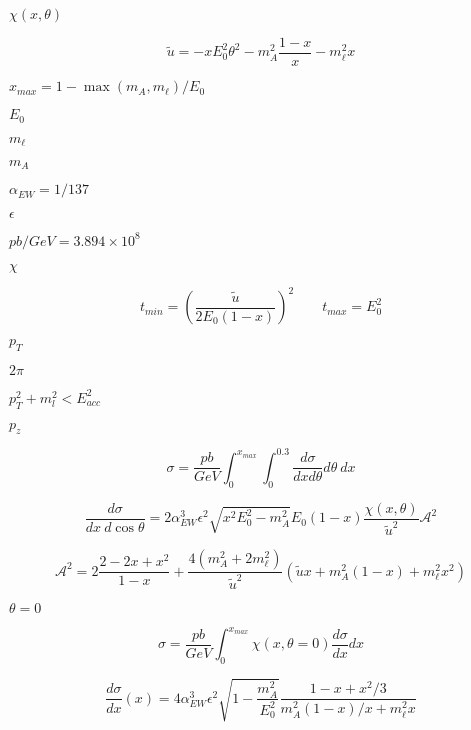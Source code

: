 \documentclass{article}
\begin{document}
$\chi(x,\theta)$
\pagebreak

\begin{equation}
\tilde{u} = -xE_0^2\theta^2 - m_A^2\frac{1-x}{x} - m_\ell^2x
\end{equation}
\pagebreak

$x_{max} = 1 - \max(m_A,m_\ell)/E_0$
\pagebreak

$E_0$
\pagebreak

$m_\ell$
\pagebreak

$m_A$
\pagebreak

$\alpha_{EW} = 1/137$
\pagebreak

$\epsilon$
\pagebreak

$pb/GeV = 3.894\times10^8$
\pagebreak

$\chi$
\pagebreak

\begin{equation}
t_{min} = \left(\frac{\tilde{u}}{2E_0(1-x)}\right)^2 \qquad t_{max} = E_0^2
\end{equation}
\pagebreak

$p_T$
\pagebreak

$2\pi$
\pagebreak

$p_T^2+m_l^2 < E_{acc}^2$
\pagebreak

$p_z$
\pagebreak

\begin{equation}
\sigma = \frac{pb}{GeV} \int_0^{x_{max}} \int_0^{0.3} \frac{d\sigma}{dx d\theta} d\theta~dx
\end{equation}
\pagebreak

\begin{equation}
\frac{d\sigma}{dx~d\cos\theta} = 2 \alpha_{EW}^3\epsilon^2 \sqrt{x^2E_0^2 - m_A^2}E_0(1-x) 
    \frac{\chi(x,\theta)}{\tilde{u}^2} \mathcal{A}^2
\end{equation}
\pagebreak

\begin{equation}
\mathcal{A}^2 = 2\frac{2-2x+x^2}{1-x}+\frac{4(m_A^2+2m_\ell^2)}{\tilde{u}^2}(\tilde{u}x + m_A^2(1-x) + m_\ell^2x^2)
\end{equation}
\pagebreak

$\theta=0$
\pagebreak

\begin{equation}
\sigma = \frac{pb}{GeV} \int_0^{x_{max}} \chi(x,\theta=0) \frac{d\sigma}{dx} dx
\end{equation}
\pagebreak

\begin{equation}
\frac{d\sigma}{dx}(x) = 4 \alpha_{EW}^3\epsilon^2 \sqrt{1-\frac{m_A^2}{E_0^2}}\frac{1-x+x^2/3}{m_A^2(1-x)/x+m_\ell^2x}
\end{equation}
\pagebreak
\end{document}
